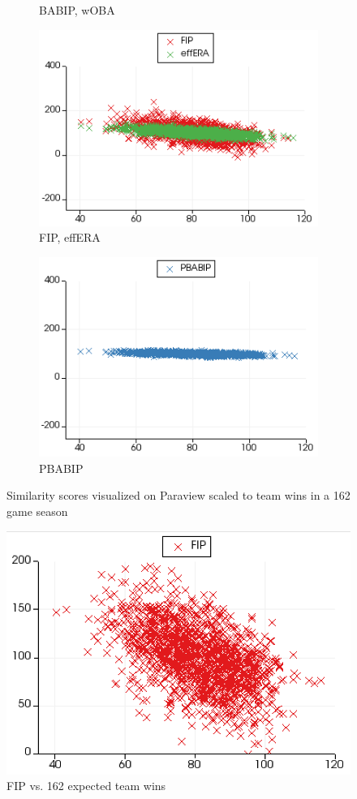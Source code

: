 \documentclass[12pt]{article}
\numberwithin{equation}{subsection}
\begin{document}
\begin{figure}[H]
\begin{subfigure}[b]{0.5\linewidth}
    \caption{BABIP, wOBA} 
    \label{fig5:b} 
    \vspace{4ex}
  \end{subfigure} 
  \begin{subfigure}[b]{0.5\linewidth}
    \centering
    \includegraphics[width=0.9\linewidth]{wins4} 
    \caption{FIP, effERA} 
    \label{fig5:c} 
  \end{subfigure}%
  \begin{subfigure}[b]{0.5\linewidth}
    \centering
    \includegraphics[width=0.9\linewidth]{wins5} 
    \caption{PBABIP} 
    \label{fig5:d} 
  \end{subfigure} 
  \caption{Similarity scores visualized on Paraview scaled to team wins in a 162 game season}
  \label{fig5} 
\end{figure}

\begin{figure}[H]
    \centering
    \includegraphics[width=0.5\linewidth]{wins8} 
    \caption{FIP vs. 162 expected team wins} 
\end{figure}
\end{document}
